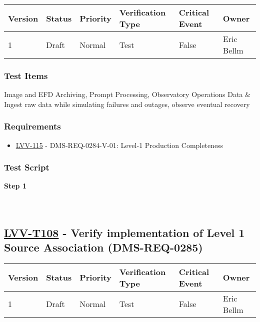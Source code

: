 \begin{longtable}[]{@{}llllll@{}}
\toprule
Version & Status & Priority & Verification Type & Critical Event &
Owner\tabularnewline
\midrule
\endhead
1 & Draft & Normal & Test & False & Eric Bellm\tabularnewline
\bottomrule
\end{longtable}

\hypertarget{test-items-83}{%
\subsubsection{Test Items}\label{test-items-83}}

Image and EFD Archiving, Prompt Processing, Observatory Operations Data
\& Ingest raw data while simulating failures and outages, observe
eventual recovery

\hypertarget{requirements-84}{%
\subsubsection{Requirements}\label{requirements-84}}

\begin{itemize}
\tightlist
\item
  \href{https://jira.lsstcorp.org/browse/LVV-115}{LVV-115} -
  DMS-REQ-0284-V-01: Level-1 Production Completeness
\end{itemize}

\hypertarget{test-script-84}{%
\subsubsection{Test Script}\label{test-script-84}}

\textbf{Step 1}\\
~\\
~\\

\hypertarget{lvv-t108---verify-implementation-of-level-1-source-association-dms-req-0285}{%
\subsection{\texorpdfstring{\href{https://jira.lsstcorp.org/secure/Tests.jspa\#/testCase/LVV-T108}{LVV-T108}
- Verify implementation of Level 1 Source Association
(DMS-REQ-0285)}{LVV-T108 - Verify implementation of Level 1 Source Association (DMS-REQ-0285)}}\label{lvv-t108---verify-implementation-of-level-1-source-association-dms-req-0285}}

\begin{longtable}[]{@{}llllll@{}}
\toprule
Version & Status & Priority & Verification Type & Critical Event &
Owner\tabularnewline
\midrule
\endhead
1 & Draft & Normal & Test & False & Eric Bellm\tabularnewline
\bottomrule
\end{longtable}


